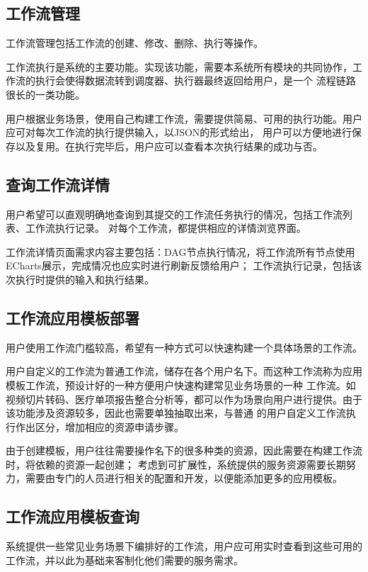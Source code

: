 \subsection{工作流管理}
工作流管理包括工作流的创建、修改、删除、执行等操作。

工作流执行是系统的主要功能。实现该功能，需要本系统所有模块的共同协作，工作流的执行会使得数据流转到调度器、执行器最终返回给用户，是一个
流程链路很长的一类功能。

用户根据业务场景，使用自己构建工作流，需要提供简易、可用的执行功能。用户应可对每次工作流的执行提供输入，以JSON的形式给出，
用户可以方便地进行保存以及复用。在执行完毕后，用户应可以查看本次执行结果的成功与否。



\subsection{查询工作流详情}

用户希望可以直观明确地查询到其提交的工作流任务执行的情况，包括工作流列表、工作流执行记录。
对每个工作流，都提供相应的详情浏览界面。

工作流详情页面需求内容主要包括：DAG节点执行情况，将工作流所有节点使用ECharts展示，完成情况也应实时进行刷新反馈给用户；
工作流执行记录，包括该次执行时提供的输入和执行结果。

\subsection{工作流应用模板部署}

用户使用工作流门槛较高，希望有一种方式可以快速构建一个具体场景的工作流。

用户自定义的工作流为普通工作流，储存在各个用户名下。而这种工作流称为应用模板工作流，预设计好的一种方便用户快速构建常见业务场景的一种
工作流。如视频切片转码、医疗单项报告整合分析等，都可以作为场景向用户进行提供。由于该功能涉及资源较多，因此也需要单独抽取出来，与普通
的用户自定义工作流执行作出区分，增加相应的资源申请步骤。

由于创建模板，用户往往需要操作名下的很多种类的资源，因此需要在构建工作流时，将依赖的资源一起创建；
考虑到可扩展性，系统提供的服务资源需要长期努力，需要由专门的人员进行相关的配置和开发，以便能添加更多的应用模板。

\subsection{工作流应用模板查询}

系统提供一些常见业务场景下编排好的工作流，用户应可用实时查看到这些可用的工作流，并以此为基础来客制化他们需要的服务需求。

